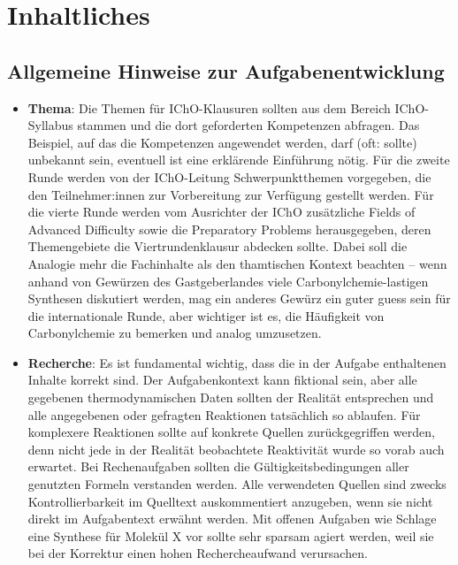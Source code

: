 \documentclass[../main.tex]{subfiles}
\begin{document}
\pagebreak
\section{Inhaltliches}
{\subsection{Allgemeine Hinweise zur Aufgabenentwicklung}}
\begin{itemize}
    \item \textbf{Thema}: Die Themen f\"ur IChO-Klausuren sollten aus dem Bereich IChO-Syllabus stammen und die dort geforderten Kompetenzen abfragen. Das Beispiel, auf das die Kompetenzen angewendet werden, darf (oft: sollte) unbekannt sein, eventuell ist eine erkl\"arende Einf\"uhrung n\"otig. F\"ur die zweite Runde werden von der IChO-Leitung Schwerpunktthemen vorgegeben, die den Teilnehmer:innen zur Vorbereitung zur Verf\"ugung gestellt werden. F\"ur die vierte Runde werden vom Ausrichter der IChO zus\"atzliche \glqq{}Fields of Advanced Difficulty\grqq{} sowie die \glqq{}Preparatory Problems\grqq{} herausgegeben, deren Themengebiete die Viertrundenklausur abdecken sollte. Dabei soll die Analogie mehr die Fachinhalte als den thamtischen Kontext beachten -- wenn anhand von Gewürzen des Gastgeberlandes viele Carbonylchemie-lastigen Synthesen diskutiert werden, mag ein anderes Gewürz ein guter guess sein für die internationale Runde, aber wichtiger ist es, die Häufigkeit von Carbonylchemie zu bemerken und analog umzusetzen. 
    \item \textbf{Recherche}: Es ist fundamental wichtig, dass die in der Aufgabe enthaltenen Inhalte korrekt sind. Der Aufgabenkontext kann fiktional sein, aber alle gegebenen thermodynamischen Daten sollten der Realit\"at entsprechen und alle angegebenen oder gefragten Reaktionen tats\"achlich so ablaufen. Für komplexere Reaktionen sollte auf konkrete Quellen zur\"uckgegriffen werden, denn nicht jede in der Realit\"at beobachtete Reaktivit\"at wurde so vorab auch erwartet. Bei Rechenaufgaben sollten die G\"ultigkeitsbedingungen aller genutzten Formeln verstanden werden. Alle verwendeten Quellen sind zwecks Kontrollierbarkeit im Quelltext auskommentiert anzugeben, wenn sie nicht direkt im Aufgabentext erw\"ahnt werden. Mit offenen Aufgaben wie \glqq Schlage eine Synthese für Molek\"ul X vor\grqq{} sollte sehr sparsam agiert werden, weil sie bei der Korrektur einen hohen Rechercheaufwand verursachen.  

\end{itemize}
\end{document}

